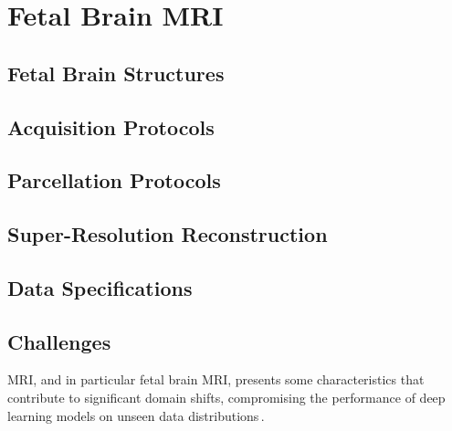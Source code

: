 \chapter{Fetal Brain MRI} \label{chap:FetalBrainMRI}
\vspace{1cm}



\section{Fetal Brain Structures}

\section{Acquisition Protocols}

\section{Parcellation Protocols}

\section{Super-Resolution Reconstruction}

\section{Data Specifications}

\section{Challenges} \label{sec:Challenges}
MRI, and in particular fetal brain MRI, presents some characteristics that contribute to significant domain shifts, compromising the performance of deep learning models on unseen data distributions\,\cite{FeTA2024_paper, FeTA2024_review}.

